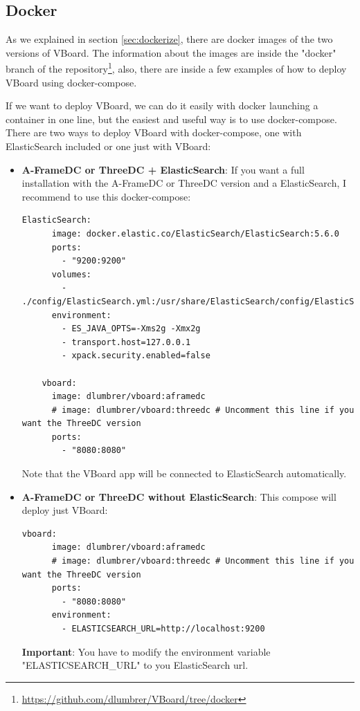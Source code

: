 \documentclass[a4paper, 12pt]{book}
\begin{document}
\subsection{Docker}
As we explained in section \ref{sec:dockerize}, there are docker images of the two versions of VBoard. The information about the images are inside the "docker" branch of the repository\footnote{\url{https://github.com/dlumbrer/VBoard/tree/docker}}, also, there are inside a few examples of how to deploy VBoard using docker-compose.

If we want to deploy VBoard, we can do it easily with docker launching a container in one line, but the easiest and useful way is to use docker-compose. There are two ways to deploy VBoard with docker-compose, one with ElasticSearch included or one just with VBoard:

\begin{itemize}
    \item \textbf{A-FrameDC or ThreeDC + ElasticSearch}: If you want a full installation with the A-FrameDC or ThreeDC version and a ElasticSearch, I recommend to use this docker-compose:
    \begin{lstlisting}[frame=single]
    ElasticSearch:
      image: docker.elastic.co/ElasticSearch/ElasticSearch:5.6.0
      ports:
        - "9200:9200"
      volumes:
        - ./config/ElasticSearch.yml:/usr/share/ElasticSearch/config/ElasticSearch.yml:ro
      environment:
        - ES_JAVA_OPTS=-Xms2g -Xmx2g
        - transport.host=127.0.0.1
        - xpack.security.enabled=false
    
    vboard:
      image: dlumbrer/vboard:aframedc
      # image: dlumbrer/vboard:threedc # Uncomment this line if you want the ThreeDC version
      ports:
        - "8080:8080"
    \end{lstlisting}
    Note that the VBoard app will be connected to ElasticSearch automatically.
    
    \item \textbf{A-FrameDC or ThreeDC without ElasticSearch}: This compose will deploy just VBoard:
    \begin{lstlisting}[frame=single]
    vboard:
      image: dlumbrer/vboard:aframedc
      # image: dlumbrer/vboard:threedc # Uncomment this line if you want the ThreeDC version
      ports:
        - "8080:8080"
      environment:
        - ELASTICSEARCH_URL=http://localhost:9200
    \end{lstlisting}
    \textbf{Important}: You have to modify the environment variable "ELASTICSEARCH\_URL" to you ElasticSearch url.
    

\end{itemize}
\end{document}
